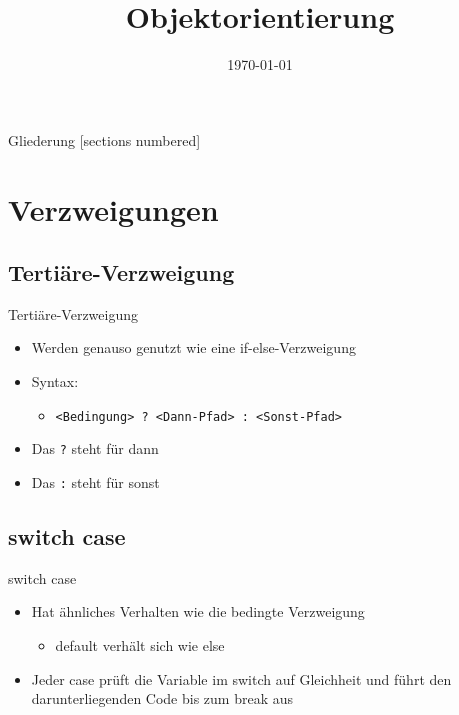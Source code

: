 



\title{Objektorientierung}
\date{\today}




\maketitle

\begin{frame}{Gliederung}
	[sections numbered]
	\tableofcontents
\end{frame}

\section{Verzweigungen}
\subsection{Tertiäre-Verzweigung}
\begin{frame}{Tertiäre-Verzweigung}
	\begin{itemize}
		\item Werden genauso genutzt wie eine if-else-Verzweigung
		\item Syntax:
		\begin{itemize}
			\item \texttt{\alert{<Bedingung>} ? \alert{<Dann-Pfad>} : \alert{<Sonst-Pfad>}}
		\end{itemize}
		\item Das \alert{\texttt{?}} steht für \alert{dann}
		\item Das \alert{\texttt{:}} steht für \alert{sonst}
	\end{itemize}		
	
\end{frame}

\subsection{switch case}
\begin{frame}{switch case}
	\begin{itemize}
		\item Hat ähnliches Verhalten wie die bedingte Verzweigung
		\begin{itemize}
			\item \alert{default} verhält sich wie \alert{else}
		\end{itemize}
		\item Jeder \alert{case} prüft die Variable im \alert{switch} auf Gleichheit und führt den darunterliegenden Code bis zum \alert{break} aus
	\end{itemize}
	
\end{frame}

